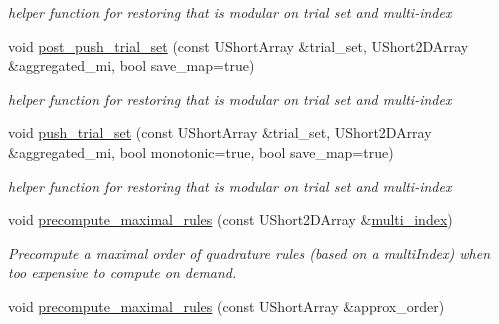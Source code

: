 \begin{DoxyCompactItemize}
\begin{DoxyCompactList}\small\item\em helper function for restoring that is modular on trial set and multi-\/index \end{DoxyCompactList}\item 
void \hyperlink{classPecos_1_1SharedOrthogPolyApproxData_a36fcbb2649d7a9ac4d065b17c789a1cc}{post\+\_\+push\+\_\+trial\+\_\+set} (const U\+Short\+Array \&trial\+\_\+set, U\+Short2\+D\+Array \&aggregated\+\_\+mi, bool save\+\_\+map=true)\label{classPecos_1_1SharedOrthogPolyApproxData_a36fcbb2649d7a9ac4d065b17c789a1cc}

\begin{DoxyCompactList}\small\item\em helper function for restoring that is modular on trial set and multi-\/index \end{DoxyCompactList}\item 
void \hyperlink{classPecos_1_1SharedOrthogPolyApproxData_af36b81f3f0211c860b4875de23d062cf}{push\+\_\+trial\+\_\+set} (const U\+Short\+Array \&trial\+\_\+set, U\+Short2\+D\+Array \&aggregated\+\_\+mi, bool monotonic=true, bool save\+\_\+map=true)\label{classPecos_1_1SharedOrthogPolyApproxData_af36b81f3f0211c860b4875de23d062cf}

\begin{DoxyCompactList}\small\item\em helper function for restoring that is modular on trial set and multi-\/index \end{DoxyCompactList}\item 
void \hyperlink{classPecos_1_1SharedOrthogPolyApproxData_afaf6090379bf5cbeb97e99004e460476}{precompute\+\_\+maximal\+\_\+rules} (const U\+Short2\+D\+Array \&\hyperlink{classPecos_1_1SharedOrthogPolyApproxData_ad93cb921a0df31fce4696f0051fe6a33}{multi\+\_\+index})\label{classPecos_1_1SharedOrthogPolyApproxData_afaf6090379bf5cbeb97e99004e460476}

\begin{DoxyCompactList}\small\item\em Precompute a maximal order of quadrature rules (based on a multi\+Index) when too expensive to compute on demand. \end{DoxyCompactList}\item 
void \hyperlink{classPecos_1_1SharedOrthogPolyApproxData_a9bc5e7748ec5da42a7e2b90b2074fd54}{precompute\+\_\+maximal\+\_\+rules} (const U\+Short\+Array \&approx\+\_\+order)\label{classPecos_1_1SharedOrthogPolyApproxData_a9bc5e7748ec5da42a7e2b90b2074fd54}


\end{DoxyCompactItemize}
